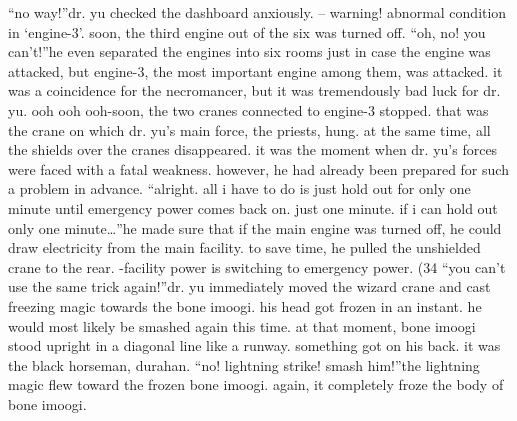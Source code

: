 “no way!”dr.
 yu checked the dashboard anxiously.
– warning! abnormal condition in ‘engine-3’.
soon, the third engine out of the six was turned off.
“oh, no! you can’t!”he even separated the engines into six rooms just in case the engine was attacked, but engine-3, the most important engine among them, was attacked.
it was a coincidence for the necromancer, but it was tremendously bad luck for dr.
 yu.
ooh ooh ooh-soon, the two cranes connected to engine-3 stopped.
 that was the crane on which dr.
 yu’s main force, the priests, hung.
at the same time, all the shields over the cranes disappeared.
 it was the moment when dr.
 yu’s forces were faced with a fatal weakness.
however, he had already been prepared for such a problem in advance.
“alright.
 all i have to do is just hold out for only one minute until emergency power comes back on.
 just one minute.
 if i can hold out only one minute…”he made sure that if the main engine was turned off, he could draw electricity from the main facility.
 to save time, he pulled the unshielded crane to the rear.
-facility power is switching to emergency power.
 (34%
“you can’t use the same trick again!”dr.
 yu immediately moved the wizard crane and cast freezing magic towards the bone imoogi.
 his head got frozen in an instant.
 he would most likely be smashed again this time.
at that moment, bone imoogi stood upright in a diagonal line like a runway.
something got on his back.
it was the black horseman, durahan.
“no! lightning strike! smash him!”the lightning magic flew toward the frozen bone imoogi.
 again, it completely froze the body of bone imoogi.

